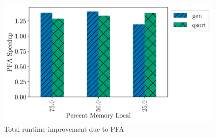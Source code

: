   \begin{figure}[h] \centering
    \includegraphics[width=0.8\columnwidth]{figs/total_speedup.png}
    \caption{Total runtime improvement due to PFA}
    \label{fig:pfa_total_speedup}
  \end{figure}

